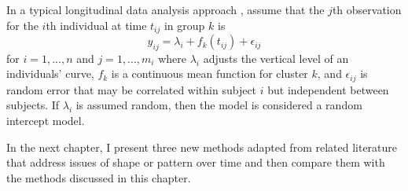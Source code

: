 In a typical longitudinal data analysis approach \cite{diggle2002}, assume that the $j$th observation for the $i$th individual at time $t_{ij}$ in group $k$ is
$$y_{ij}=\lambda_{i}+f_k(t_{ij})+\epsilon_{ij}$$
for $i=1,...,n$ and $j=1,...,m_{i}$ where $\lambda_{i}$ adjusts the vertical level of an individuals' curve, $f_k$ is a continuous mean function for cluster $k$, and $\epsilon_{ij}$ is random error that may be correlated within subject $i$ but independent between subjects. If $\lambda_{i}$ is assumed random, then the model is considered a random intercept model. 

 In the next chapter, I present three new methods adapted from related literature that address issues of shape or pattern over time and then compare them with the methods discussed in this chapter.	
